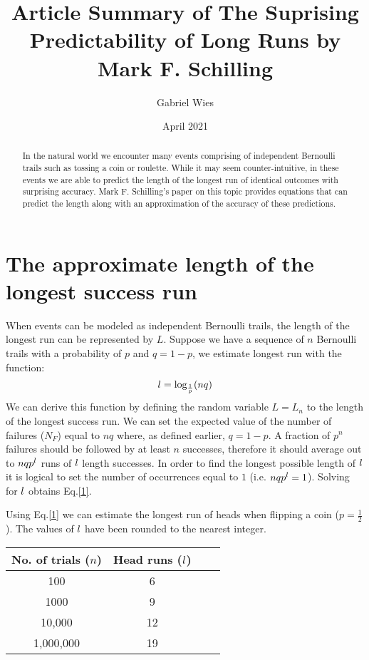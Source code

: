 \documentclass{article}
\title{Article Summary of The Suprising Predictability of Long Runs by Mark F. Schilling}
\author{Gabriel Wies}
\date{April 2021}
\begin{document}
\maketitle
\begin{abstract}
    In the natural world we encounter many events comprising of independent Bernoulli trails such as tossing a coin or roulette. While it may seem counter-intuitive, in these events we are able to predict the length of the longest run of identical outcomes with surprising accuracy. Mark F. Schilling's paper on this topic provides equations that can predict the length along with an approximation of the accuracy of these predictions.
\end{abstract}
\section{The approximate length of the longest success run}
When events can be modeled as independent Bernoulli trails, the length of the longest run can be represented by $L$. Suppose we have a sequence of $n$ Bernoulli trails with a probability of $p$ and $q=1-p$, we estimate longest run with the function:
\begin{equation}\label{1}
    \mathnormal{l} = \log_\frac{1}{p}(nq)
\end{equation}
We can derive this function by defining the random variable $L=L_n$ to the length of the longest success run. We can set the expected value of the number of failures ($N_F$) equal to $nq$ where, as defined earlier, $q=1-p$. A fraction of $p^n$ failures should be followed by at least $n$ successes, therefore it should average out to $nqp^\mathnormal{l}$ runs of $\mathnormal{l}$ length successes. In order to find the longest possible length of $\mathnormal{l}$ it is logical to set the number of occurrences equal to $1$  (i.e. $nqp^\mathnormal{l}=1$). Solving for $\mathnormal{l}$ obtains Eq.\ref{1}. 

Using Eq.\ref{1} we can estimate the longest run of heads when flipping a coin ($p=\frac{1}{2}$). The values of $\mathnormal{l}$ have been rounded to the nearest integer.

\begin{center}\label{TABLE 1}
 \begin{tabular}{|c | c | c | c|} 
 \hline
 No. of trials ($n$) & Head runs ($\mathnormal{l}$)\\ [0.5ex] 
 \hline\hline
 100 & 6  \\ 
 \hline
 1000 & 9  \\
 \hline
 10,000 & 12  \\
 \hline
 1,000,000 & 19 \\
 \hline
 
\end{tabular}
\end{center}
\end{document}
